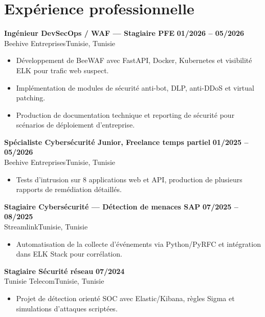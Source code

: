 \documentclass[a4paper,10pt]{article}
\newcommand{\cventry}[4]{\textbf{#1} \hfill \textbf{#4}\\[1pt]#2{\ifx\relax#3\relax\else, #3\fi}\par\vspace{2pt}}
\begin{document}
\section{Expérience professionnelle}
\cventry{Ingénieur DevSecOps / WAF --- Stagiaire PFE}{Beehive Entreprises}{Tunisie}{01/2026 -- 05/2026}
\begin{itemize}
  \item Développement de BeeWAF avec FastAPI, Docker, Kubernetes et visibilité ELK pour trafic web suspect.
  \item Implémentation de modules de sécurité anti-bot, DLP, anti-DDoS et virtual patching.
  \item Production de documentation technique et reporting de sécurité pour scénarios de déploiement d'entreprise.
\end{itemize}
\cventry{Spécialiste Cybersécurité Junior, Freelance temps partiel}{Beehive Entreprises}{Tunisie}{01/2025 -- 05/2026}
\begin{itemize}
  \item Tests d'intrusion sur 8 applications web et API, production de plusieurs rapports de remédiation détaillés.
\end{itemize}
\cventry{Stagiaire Cybersécurité — Détection de menaces SAP}{Streamlink}{Tunisie}{07/2025 -- 08/2025}
\begin{itemize}
  \item Automatisation de la collecte d'événements via Python/PyRFC et intégration dans ELK Stack pour corrélation.
\end{itemize}
\cventry{Stagiaire Sécurité réseau}{Tunisie Telecom}{Tunisie}{07/2024}
\begin{itemize}
  \item Projet de détection orienté SOC avec Elastic/Kibana, règles Sigma et simulations d'attaques scriptées.
\end{itemize}
\end{document}
